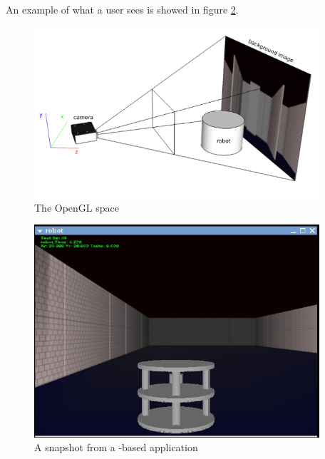 %
An example of what a user sees is showed in figure \ref{fig:snap}.
%
\begin{figure}[!h]
  \begin{center}
    \includegraphics[width=300pt]{img/camera_frustum_scheme.png}
    \caption{The OpenGL space}
    \label{fig:openglspace}
  \end{center}
\end{figure}
%
\begin{figure}[!h]
  \begin{center}
    \includegraphics[width=300pt]{img/rear_snapshot_large.jpg}
    \caption{A snapshot from a \framework{}-based application}
    \label{fig:snap}
  \end{center}
\end{figure}
%

